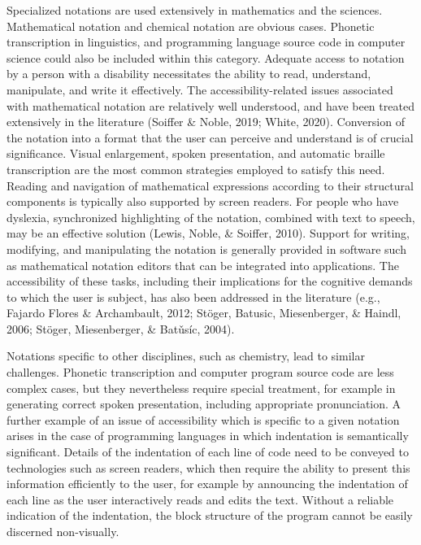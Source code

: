 \documentclass{sig-alternate} %
\begin{document}
\begin{large}
Specialized notations are used extensively in mathematics and the sciences. Mathematical notation and chemical notation are obvious cases. Phonetic transcription in linguistics, and programming language source code in computer science could also be included within this category. Adequate access to notation by a person with a disability necessitates the ability to read, understand, manipulate, and write it effectively. The accessibility-related issues associated with mathematical notation are relatively well understood, and have been treated extensively in the literature (Soiffer \& Noble, 2019; White, 2020). Conversion of the notation into a format that the user can perceive and understand is of crucial significance. Visual enlargement, spoken presentation, and automatic braille transcription are the most common strategies employed to satisfy this need. Reading and navigation of mathematical expressions according to their structural components is typically also supported by screen readers. For people who have dyslexia, synchronized highlighting of the notation, combined with text to speech, may be an effective solution (Lewis, Noble, \& Soiffer, 2010). Support for writing, modifying, and manipulating the notation is generally provided in software such as mathematical notation editors that can be integrated into applications. The accessibility of these tasks, including their implications for the cognitive demands to which the user is subject, has also been addressed in the literature (e.g., Fajardo Flores \& Archambault, 2012; Stöger, Batusic, Miesenberger, \& Haindl, 2006; Stöger, Miesenberger, \& Batǔsíc, 2004).

Notations specific to other disciplines, such as chemistry, lead to similar challenges. Phonetic transcription and computer program source code are less complex cases, but they nevertheless require special treatment, for example in generating correct spoken presentation, including appropriate pronunciation. A further example of an issue of accessibility which is specific to a given notation arises in the case of programming languages in which indentation is semantically significant. Details of the indentation of each line of code need to be conveyed to technologies such as screen readers, which then require the ability to present this information efficiently to the user, for example by announcing the indentation of each line as the user interactively reads and edits the text. Without a reliable indication of the indentation, the block structure of the program cannot be easily discerned non-visually.


\end{large}
\end{document}

